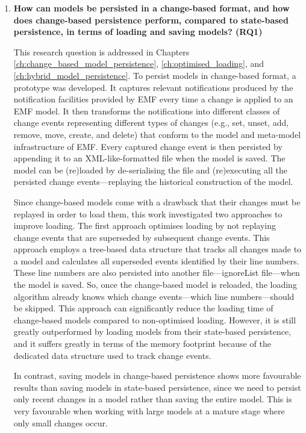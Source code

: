 \begin{enumerate}
  \item \textbf{How can models be persisted in a change-based format, and how does change-based persistence perform, compared to state-based persistence, in terms of loading and saving models? (RQ1)}
  
  This research question is addressed in Chapters \ref{ch:change_based_model_persistence}, \ref{ch:optimised_loading}, and \ref{ch:hybrid_model_persistence}. To persist models in change-based format, a prototype was developed. It captures relevant notifications produced by the notification facilities provided by EMF every time a change is applied to an EMF model. It then transforms the notifications into different classes of change events representing different types of changes (e.g., set, unset, add, remove, move, create, and delete) that conform to the model and meta-model infrastructure of EMF. Every captured change event is then persisted by appending it to an XML-like-formatted file when the model is saved. The model can be (re)loaded by de-serialising the file and (re)executing all the persisted change events—replaying the historical construction of the model.
  
  Since change-based models come with a drawback that their changes must be replayed in order to load them, this work investigated two approaches to improve loading. The first approach optimises loading by not replaying change events that are superseded by subsequent change events. This approach employs a tree-based data structure that tracks all changes made to a model and calculates all superseded events identified by their line numbers. These line numbers are also persisted into another file—\textsf{ignoreList} file—when the model is saved. So, once the change-based model is reloaded, the loading algorithm already knows which change events—which line numbers—should be skipped. This approach can significantly reduce the loading time of change-based models compared to non-optimised loading. However, it is still greatly outperformed by loading models from their state-based persistence, and it suffers greatly in terms of the memory footprint because of the dedicated data structure used to track change events.
  
  In contrast, saving models in change-based persistence shows more favourable results than saving models in state-based persistence, since we need to persist only recent changes in a model rather than saving the entire model. This is very favourable when working with large models at a mature stage where only small changes occur.
  

\end{enumerate}
